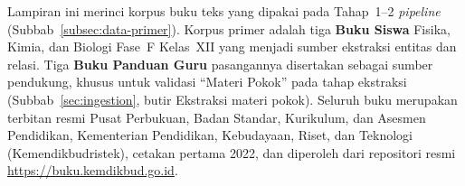 \documentclass[../../thesis]{subfiles}
\begin{document}
\ifSubfilesClassLoaded{}{\appendix\setcounter{chapter}{1}}

\label{lamp:korpus}

Lampiran ini merinci korpus buku teks yang dipakai pada Tahap~1--2
\textit{pipeline} (Subbab~\ref{subsec:data-primer}). Korpus primer adalah tiga
\textbf{Buku Siswa} Fisika, Kimia, dan Biologi Fase~F Kelas~XII yang menjadi
sumber ekstraksi entitas dan relasi. Tiga \textbf{Buku Panduan Guru} pasangannya
disertakan sebagai sumber pendukung, khusus untuk validasi ``Materi Pokok'' pada
tahap ekstraksi (Subbab~\ref{sec:ingestion}, butir Ekstraksi materi pokok).
Seluruh buku merupakan terbitan resmi Pusat Perbukuan, Badan Standar, Kurikulum,
dan Asesmen Pendidikan, Kementerian Pendidikan, Kebudayaan, Riset, dan Teknologi
(Kemendikbudristek), cetakan pertama 2022, dan diperoleh dari repositori resmi
\url{https://buku.kemdikbud.go.id}.
\end{document}
